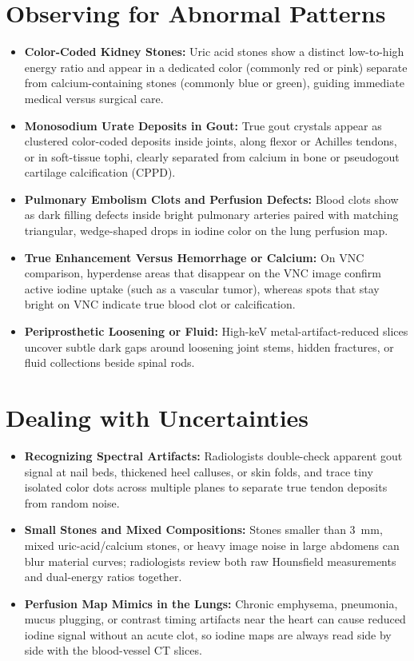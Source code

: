 \section{Observing for Abnormal Patterns}
\begin{itemize}
\item \textbf{Color-Coded Kidney Stones:} Uric acid stones show a distinct low-to-high energy ratio and appear in a dedicated color (commonly red or pink) separate from calcium-containing stones (commonly blue or green), guiding immediate medical versus surgical care.
\item \textbf{Monosodium Urate Deposits in Gout:} True gout crystals appear as clustered color-coded deposits inside joints, along flexor or Achilles tendons, or in soft-tissue tophi, clearly separated from calcium in bone or pseudogout cartilage calcification (CPPD).
\item \textbf{Pulmonary Embolism Clots and Perfusion Defects:} Blood clots show as dark filling defects inside bright pulmonary arteries paired with matching triangular, wedge-shaped drops in iodine color on the lung perfusion map.
\item \textbf{True Enhancement Versus Hemorrhage or Calcium:} On VNC comparison, hyperdense areas that disappear on the VNC image confirm active iodine uptake (such as a vascular tumor), whereas spots that stay bright on VNC indicate true blood clot or calcification.
\item \textbf{Periprosthetic Loosening or Fluid:} High-keV metal-artifact-reduced slices uncover subtle dark gaps around loosening joint stems, hidden fractures, or fluid collections beside spinal rods.
\end{itemize}

\section{Dealing with Uncertainties}
\begin{itemize}
\item \textbf{Recognizing Spectral Artifacts:} Radiologists double-check apparent gout signal at nail beds, thickened heel calluses, or skin folds, and trace tiny isolated color dots across multiple planes to separate true tendon deposits from random noise.
\item \textbf{Small Stones and Mixed Compositions:} Stones smaller than 3~mm, mixed uric-acid/calcium stones, or heavy image noise in large abdomens can blur material curves; radiologists review both raw Hounsfield measurements and dual-energy ratios together.
\item \textbf{Perfusion Map Mimics in the Lungs:} Chronic emphysema, pneumonia, mucus plugging, or contrast timing artifacts near the heart can cause reduced iodine signal without an acute clot, so iodine maps are always read side by side with the blood-vessel CT slices.
\end{itemize}

